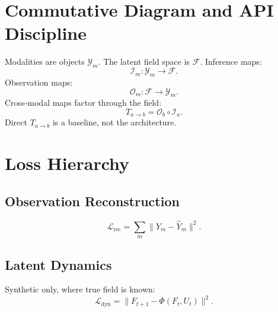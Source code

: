\documentclass[11pt]{article}
\newcommand{\loss}{\mathcal{L}}
\newcommand{\Obs}{\mathcal{O}}
\newcommand{\Infer}{\mathcal{I}}
\begin{document}
\section{Commutative Diagram and API Discipline}

Modalities are objects $\mathcal{Y}_m$. The latent field space is $\mathcal{F}$. Inference maps:
\begin{equation}
\Infer_m:\mathcal{Y}_m\rightarrow\mathcal{F}.
\end{equation}
Observation maps:
\begin{equation}
\Obs_m:\mathcal{F}\rightarrow\mathcal{Y}_m.
\end{equation}
Cross-modal maps factor through the field:
\begin{equation}
T_{a\rightarrow b}=\Obs_b\circ \Infer_a.
\end{equation}
Direct $T_{a\rightarrow b}$ is a baseline, not the architecture.

\begin{center}
\end{center}

\section{Loss Hierarchy}

\subsection{Observation Reconstruction}
\begin{equation}
\loss_{\mathrm{rec}}=\sum_m\|Y_m-\hat{Y}_m\|^2.
\end{equation}

\subsection{Latent Dynamics}
Synthetic only, where true field is known:
\begin{equation}
\loss_{\mathrm{dyn}}=\|F_{t+1}-\Phi(F_t,U_t)\|^2.
\end{equation}
\end{document}

